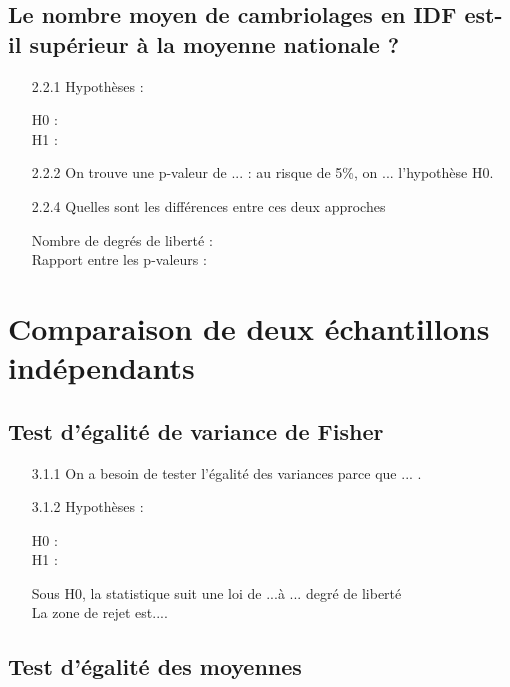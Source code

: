 \documentclass{article}
\begin{document}
\subsection{Le nombre moyen de cambriolages en IDF est-il supérieur à la moyenne nationale ?}
\begin{itemize}
	\item[2.2.1] Hypothèses : 
\begin{description}
    \item[H0 :]
    \item[H1 :]
\end{description}

\item[2.2.2] On trouve une p-valeur de ... : au risque de 5\%, on ... l'hypothèse H0.

\item[2.2.4]Quelles sont les différences entre ces deux approches 
\begin{description}
    \item[Nombre de degrés de liberté :]
    \item[Rapport entre les p-valeurs :]
\end{description}
\end{itemize}



\section{Comparaison de deux échantillons indépendants}
\subsection{Test d'égalité de variance de Fisher} 
\begin{itemize}
\item [3.1.1]On a besoin de tester l'égalité des variances parce que ... .

\item [3.1.2] Hypothèses : 
\begin{description}
	\item[H0 :]
	\item[H1 :]
\end{description}
Sous H0, la statistique suit une loi de ...à ... degré de liberté\\
La zone de rejet est....\\
\end{itemize}
\vspace{3mm}


\subsection{Test d'égalité des moyennes }
\end{document}
